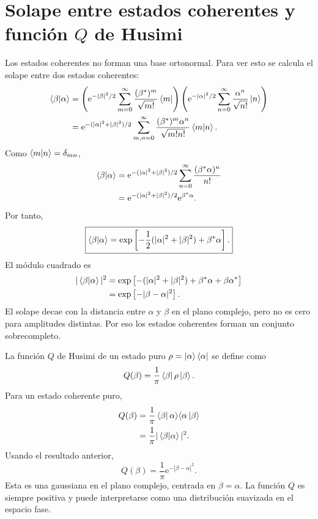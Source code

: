 \documentclass[11pt]{article}
\newcommand{\ee}{\mathrm{e}}
\begin{document}
\section{\texorpdfstring{Solape entre estados coherentes y funci\'on $Q$ de Husimi}{Solape entre estados coherentes y funcion Q de Husimi}}

Los estados coherentes no forman una base ortonormal. Para ver esto se calcula
el solape entre dos estados coherentes:
\begin{align}
  \braket{\beta|\alpha}
  &=
  \left(
  \ee^{-|\beta|^2/2}
  \sum_{m=0}^{\infty}
  \frac{(\beta^*)^m}{\sqrt{m!}}\bra m
  \right)
  \left(
  \ee^{-|\alpha|^2/2}
  \sum_{n=0}^{\infty}
  \frac{\alpha^n}{\sqrt{n!}}\ket n
  \right)\\
  &=
  \ee^{-(|\alpha|^2+|\beta|^2)/2}
  \sum_{m,n=0}^{\infty}
  \frac{(\beta^*)^m\alpha^n}{\sqrt{m!n!}}\braket{m|n}.
\end{align}
Como $\braket{m|n}=\delta_{mn}$,
\begin{align}
  \braket{\beta|\alpha}
  &=
  \ee^{-(|\alpha|^2+|\beta|^2)/2}
  \sum_{n=0}^{\infty}\frac{(\beta^*\alpha)^n}{n!}\\
  &=
  \ee^{-(|\alpha|^2+|\beta|^2)/2}
  \ee^{\beta^*\alpha}.
\end{align}
Por tanto,
\begin{equation}
  \boxed{
  \braket{\beta|\alpha}
  =
  \exp\left[
  -\frac12(|\alpha|^2+|\beta|^2)
  +\beta^*\alpha
  \right].
  }
\end{equation}
El m\'odulo cuadrado es
\begin{align}
  |\braket{\beta|\alpha}|^2
  &=
  \exp\left[
  -(|\alpha|^2+|\beta|^2)
  +\beta^*\alpha+\beta\alpha^*
  \right]\\
  &=
  \exp\left[-|\beta-\alpha|^2\right].
\end{align}
El solape decae con la distancia entre $\alpha$ y $\beta$ en el plano
complejo, pero no es cero para amplitudes distintas. Por eso los estados
coherentes forman un conjunto sobrecompleto.

La funci\'on $Q$ de Husimi de un estado puro $\rho=\ket{\alpha}\bra{\alpha}$ se
define como
\begin{equation}
  Q(\beta)
  =\frac1\pi\bra{\beta}\rho\ket{\beta}.
\end{equation}
Para un estado coherente puro,
\begin{align}
  Q(\beta)
  &=\frac1\pi
    \bra{\beta}\alpha\rangle\langle\alpha\ket{\beta}\\
  &=\frac1\pi|\braket{\beta|\alpha}|^2.
\end{align}
Usando el resultado anterior,
\begin{equation}
  \boxed{
  Q(\beta)=\frac1\pi\ee^{-|\beta-\alpha|^2}.
  }
\end{equation}
Esta es una gaussiana en el plano complejo, centrada en $\beta=\alpha$. La
funci\'on $Q$ es siempre positiva y puede interpretarse como una distribuci\'on
suavizada en el espacio fase.
\end{document}
